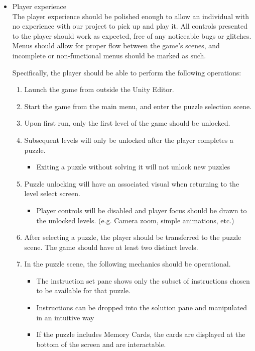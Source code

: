 \begin{itemize}
	\item Player experience\\
	The player experience should be polished enough to allow an individual with no 
	experience with our project to pick up and play it. All controls presented to the 
	player should work as expected, free of any noticeable bugs or glitches. Menus 
	should allow for proper flow between the game's scenes, and incomplete or 
	non-functional menus should be marked as such.

	Specifically, the player should be able to perform the following operations:
	\begin{enumerate}
		\item Launch the game from outside the Unity Editor.
		\item Start the game from the main menu, and enter the puzzle selection scene.
		\item Upon first run, only the first level of the game should be unlocked.
		\item Subsequent levels will only be unlocked after the player completes a puzzle.
		\begin{itemize}
			\item Exiting a puzzle without solving it will not unlock new puzzles
		\end{itemize}
		\item Puzzle unlocking will have an associated visual when returning to the level select screen.
		\begin{itemize}
			\item Player controls will be disabled and player focus should be drawn to the unlocked levels. (e.g. Camera zoom, simple animations, etc.)
		\end{itemize}
		\item After selecting a puzzle, the player should be transferred to the puzzle scene. The game should have at least two distinct levels.
		\item In the puzzle scene, the following mechanics should be operational.
		\begin{itemize}
			\item The instruction set pane shows only the subset of instructions chosen 
			to be available for that puzzle.
			\item Instructions can be dropped into the solution pane and manipulated in an intuitive way
			\item If the puzzle includes Memory Cards, the cards are displayed at the 
			bottom of the screen and are interactable.

\end{itemize}
\end{enumerate}
\end{itemize}
